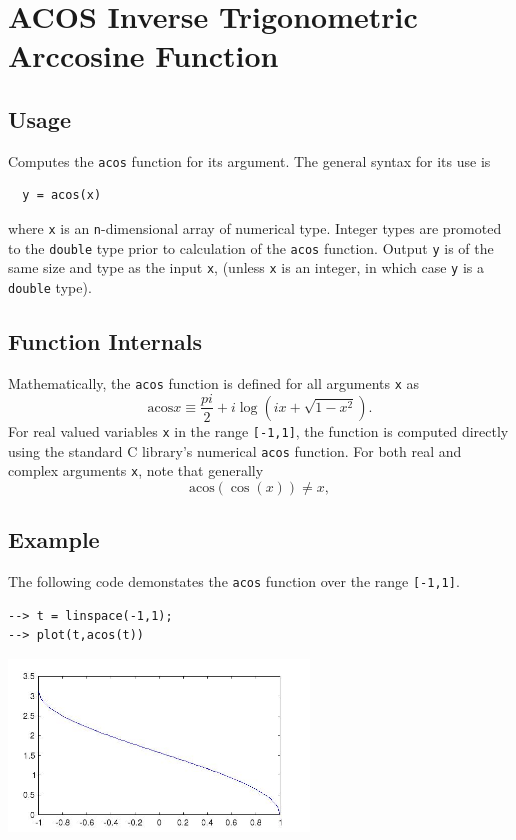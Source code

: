 \section{ACOS Inverse Trigonometric Arccosine Function}

\subsection{Usage}

Computes the \verb|acos| function for its argument.  The general
syntax for its use is
\begin{verbatim}
  y = acos(x)
\end{verbatim}
where \verb|x| is an \verb|n|-dimensional array of numerical type.
Integer types are promoted to the \verb|double| type prior to
calculation of the \verb|acos| function.  Output \verb|y| is of the
same size and type as the input \verb|x|, (unless \verb|x| is an
integer, in which case \verb|y| is a \verb|double| type).  
\subsection{Function Internals}

Mathematically, the \verb|acos| function is defined for all 
arguments \verb|x| as
\[
 \mathrm{acos} x \equiv \frac{pi}{2} + i \log \left(i x + 
  \sqrt{1-x^2}\right).
\]
For real valued variables \verb|x| in the range \verb|[-1,1]|, the function is
computed directly using the standard C library's numerical \verb|acos|
function. For both real and complex arguments \verb|x|, note that generally
\[
  \mathrm{acos}(\cos(x)) \neq x,
\]
\subsection{Example}

The following code demonstates the \verb|acos| function over the range 
\verb|[-1,1]|.
\begin{verbatim}
--> t = linspace(-1,1);
--> plot(t,acos(t))
\end{verbatim}


\centerline{\includegraphics[width=8cm]{acosplot}}


